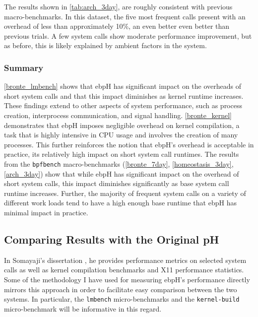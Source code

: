 \documentclass[
  12pt]{findlay}
\newcommand{\passthrough}[1]{#1}
\begin{document}
The results shown in \autoref{tab:arch_3day}, are roughly consistent
with previous macro-benchmarks. In this dataset, the five most frequent
calls present with an overhead of less than approximately 10\%, an even
better even better than previous trials. A few system calls show
moderate performance improvement, but as before, this is likely
explained by ambient factors in the system.

\hypertarget{summary}{%
\subsubsection{Summary}\label{summary}}

\autoref{bronte_lmbench} shows that ebpH has significant impact on the
overheads of short system calls and that this impact diminishes as
kernel runtime increases. These findings extend to other aspects of
system performance, such as process creation, interprocess
communication, and signal handling. \autoref{bronte_kernel} demonstrates
that ebpH imposes negligible overhead on kernel compilation, a task that
is highly intensive in CPU usage and involves the creation of many
processes. This further reinforces the notion that ebpH's overhead is
acceptable in practice, its relatively high impact on short system call
runtimes. The results from the \passthrough{\lstinline!bpfbench!}
macro-benchmarks (\autoref{bronte_7day}, \autoref{homeostasis_3day},
\autoref{arch_3day}) show that while ebpH has significant impact on the
overhead of short system calls, this impact diminishes significantly as
base system call runtime increases. Further, the majority of frequent
system calls on a variety of different work loads tend to have a high
enough base runtime that ebpH has minimal impact in practice.

\hypertarget{comparing-results-with-the-original-ph}{%
\subsection{Comparing Results with the Original
pH}\label{comparing-results-with-the-original-ph}}

\label{sec:compare}

In Somayaji's dissertation \autocite{soma02}, he provides performance
metrics on selected system calls as well as kernel compilation
benchmarks and X11 performance statistics. Some of the methodology I
have used for measuring ebpH's performance directly mirrors this
approach in order to facilitate easy comparison between the two systems.
In particular, the \passthrough{\lstinline!lmbench!} micro-benchmarks
and the \passthrough{\lstinline!kernel-build!} micro-benchmark will be
informative in this regard.
\end{document}
